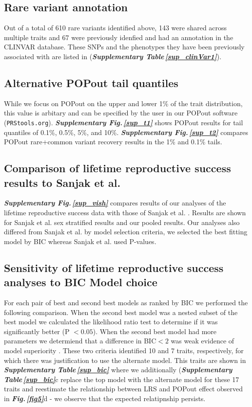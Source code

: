 \documentclass[12pt]{zHenriquesLab-StyleBioRxiv}
\newcommand\fref[1]{\normalsize{\textbf{\textit{Fig.\,\ref{#1}}}}\normalsize{}}
\newcommand\sref[1]{\normalsize{\textbf{\textit{Supplementary Fig.\,\ref{#1}}}}\normalsize{}}
\newcommand\stref[1]{\normalsize{\textbf{\textit{Supplementary Table\,\ref{#1}}}}\normalsize{}}
\begin{document}
{\subsection*{Rare variant annotation}
Out of a total of 610 rare variants identified above, 143 were shared
across multiple traits and 67 were previously idenfied and had an
annotation in the CLINVAR database.  These SNPs and the phenotypes
they have been previously associated with are listed in
(\stref{sup_clinVar1}).

\subsection*{Alternative POPout tail quantiles} 
While we focus on POPout on the upper and lower 1\% of the trait
distribution, this value is arbitary and can be specified by the user
in our POPout software ({\tt PRStools.org}). \sref{sup_t1} shows
POPout results for tail quantiles of 0.1\%, 0.5\%, 5\%,
and 10\%. \sref{sup_t2} compares POPout rare+common variant recovery results
in the 1\% and 0.1\% tails.

\subsection*{Comparison of lifetime reproductive success results to Sanjak et al.}
\sref{sup_vish} compares results of our analyses of the lifetime
reproductive success data with those of Sanjak et
al. \cite{Sanjak2018}. Results are shown for Sanjak et al. sex
stratified results and our pooled results. Our analyses also differed
from Sanjak et al. by model selection criteria, we selected the best
fitting model by BIC whereas Sanjak et al. used P-values.  }

\subsection*{Sensitivity of lifetime reproductive success analyses to BIC Model choice}
For each pair of best and second best models as ranked by BIC we
performed the following comparison.  When the second best model was a
nested subset of the best model we calculated the likelihood ratio
test to determine if it was significantly better (P $<0.05$).  When
the second best model had more parameters we determiend that a
difference in BIC$<2$ was weak evidence of model
superiority \cite{bayesguys}. These two criteria identified 10 and 7
traits, respectively, for which there was justification to use the
alternate model.  This traits are shown in \stref{sup_bic} where we
additionally (\stref{sup_bic}{c} replace the top model with the
alternate model for these 17 traits and reestimate the relationship
between LRS and POPout effect observed in \fref{fig5}{d} - we observe
that the expected relatipnship persists.
\end{document}
